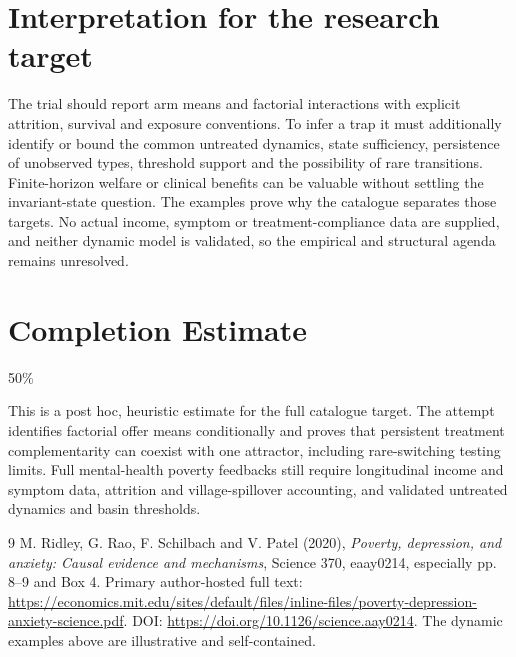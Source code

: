 \documentclass[11pt,a4paper]{article}
\begin{document}
\section{Interpretation for the research target}
The trial should report arm means and factorial interactions with explicit attrition, survival and exposure conventions. To infer a trap it must additionally identify or bound the common untreated dynamics, state sufficiency, persistence of unobserved types, threshold support and the possibility of rare transitions. Finite-horizon welfare or clinical benefits can be valuable without settling the invariant-state question. The examples prove why the catalogue separates those targets. No actual income, symptom or treatment-compliance data are supplied, and neither dynamic model is validated, so the empirical and structural agenda remains unresolved.

\section{Completion Estimate}
50\%

This is a post hoc, heuristic estimate for the full catalogue target.
The attempt identifies factorial offer means conditionally and proves that persistent treatment complementarity can coexist with one attractor, including rare-switching testing limits. Full mental-health poverty feedbacks still require longitudinal income and symptom data, attrition and village-spillover accounting, and validated untreated dynamics and basin thresholds.

\begin{thebibliography}{9}
 M. Ridley, G. Rao, F. Schilbach and V. Patel (2020), \emph{Poverty, depression, and anxiety: Causal evidence and mechanisms}, Science 370, eaay0214, especially pp. 8--9 and Box 4. Primary author-hosted full text: \url{https://economics.mit.edu/sites/default/files/inline-files/poverty-depression-anxiety-science.pdf}. DOI: \url{https://doi.org/10.1126/science.aay0214}. The dynamic examples above are illustrative and self-contained.
\end{thebibliography}
\end{document}
